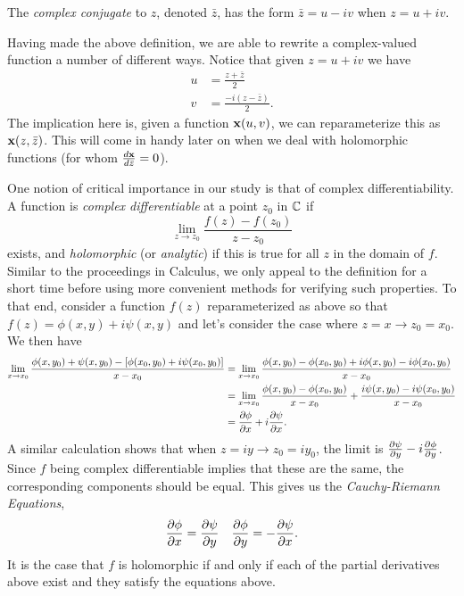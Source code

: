     \begin{defn}
      The \emph{complex conjugate} to $z$, denoted $\bar{z}$, has the form $\bar{z} = u - i v$ when $z = u + iv$.
    \end{defn}

    \begin{unno_rem}
      Having made the above definition, we are able to rewrite a complex-valued function a number of different ways. Notice that given $z = u + iv$ we have
      \begin{align*}
        u &= \frac{z + \bar{z}}{2}\\
        v &= \frac{-i(z - \bar{z})}{2}.
      \end{align*}
      The implication here is, given a function $\mathbf{x}(u, v)$, we can reparameterize this as $\mathbf{x}(z, \bar{z})$. This will come in handy later on when we deal with holomorphic functions (for whom $\frac{d\mathbf{x}}{d\bar{z}} = 0$).
    \end{unno_rem}

    One notion of critical importance in our study is that of complex differentiability. A function is \emph{complex differentiable} at a point $z_0$ in $\mathbb{C}$ if
    \[
      \lim_{z\to z_0}\frac{f(z) - f(z_0)}{z - z_0}
    \]
    exists, and \emph{holomorphic} (or \emph{analytic}) if this is true for all $z$ in the domain of $f$. Similar to the proceedings in Calculus, we only appeal to the definition for a short time before using more convenient methods for verifying such properties. To that end, consider a function $f(z)$ reparameterized as above so that $f(z) = \phi(x, y) + i\psi(x, y)$ and let's consider the case where $z = x \to z_0 = x_0$. We then have
    \begin{align*}
      \lim_{x \to x_0}\frac{\phi(x, y_0) + \psi(x, y_0) - [\phi(x_0, y_0) + i\psi(x_0, y_0)]}{x - x_0} &= \lim_{x \to x_0}\frac{\phi(x, y_0) - \phi(x_0, y_0) + i\phi(x, y_0) - i\phi(x_0, y_0)}{x - x_0}\\
      &= \lim_{x \to x_0} \frac{\phi(x, y_0) - \phi(x_0, y_0)}{x - x_0} + \frac{i\psi(x, y_0) - i\psi(x_0, y_0)}{x - x_0}\\
      &= \frac{\partial\phi}{\partial x} + i\frac{\partial\psi}{\partial x}.
    \end{align*}
    A similar calculation shows that when $z = iy \to z_0 = iy_0$, the limit is $\frac{\partial\psi}{\partial y} - i\frac{\partial\phi}{\partial y}$. Since $f$ being complex differentiable implies that these are the same, the corresponding components should be equal. This gives us the \emph{Cauchy-Riemann Equations},
    \[
      \begin{array}{cc}
        \displaystyle\frac{\partial\phi}{\partial x} = \frac{\partial\psi}{\partial y} & \displaystyle\frac{\partial\phi}{\partial y} = -\frac{\partial\psi}{\partial x}.
      \end{array}
    \]
    It is the case that $f$ is holomorphic if and only if each of the partial derivatives above exist and they satisfy the equations above.

